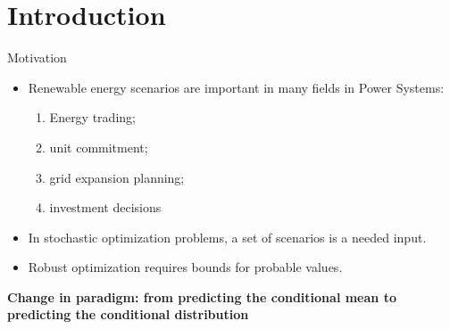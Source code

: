 \section{Introduction}\label{introduction}


\begin{frame}{Motivation}

	\begin{itemize}
		\item
		Renewable energy scenarios are important in many fields in Power
		Systems:
		
		\begin{enumerate}
			\def\labelenumi{\roman{enumi})}
			
			\item
			Energy trading;
			\item
			unit commitment;
			\item
			grid expansion planning;
			\item
			investment decisions
		\end{enumerate}
		\item
		In stochastic optimization problems, a set of scenarios is a needed
		input.
		\item
		Robust optimization requires bounds for probable values.
	\end{itemize}

	\textbf{Change in paradigm: from predicting the conditional mean to
		predicting the conditional distribution}

\end{frame}



